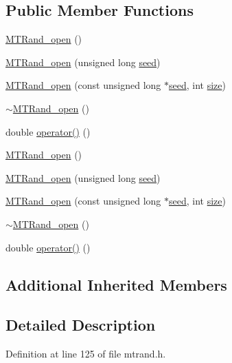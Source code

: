 \subsection*{Public Member Functions}
\begin{DoxyCompactItemize}
\item 
\hyperlink{a00019_a58140b54564be39382da163954177389}{M\+T\+Rand\+\_\+open} ()
\item 
\hyperlink{a00019_a1f55ebc1052f5343f8d6e08a752ef957}{M\+T\+Rand\+\_\+open} (unsigned long \hyperlink{a00018_a0c57076fe30358e0700a7ce1baa0ea27}{seed})
\item 
\hyperlink{a00019_a0216992f4dfa5acf22ee8c585eeac488}{M\+T\+Rand\+\_\+open} (const unsigned long $\ast$\hyperlink{a00018_a0c57076fe30358e0700a7ce1baa0ea27}{seed}, int \hyperlink{a00104_ae113ea7f9e515a12ac4b5595c6faf61e}{size})
\item 
\hyperlink{a00019_a4f4774b5d9b79972dedaec984b248581}{$\sim$\+M\+T\+Rand\+\_\+open} ()
\item 
double \hyperlink{a00019_ac408aa400ca59fc2afc888d88f98d807}{operator()} ()
\item 
\hyperlink{a00019_a58140b54564be39382da163954177389}{M\+T\+Rand\+\_\+open} ()
\item 
\hyperlink{a00019_a1f55ebc1052f5343f8d6e08a752ef957}{M\+T\+Rand\+\_\+open} (unsigned long \hyperlink{a00018_a0c57076fe30358e0700a7ce1baa0ea27}{seed})
\item 
\hyperlink{a00019_a0216992f4dfa5acf22ee8c585eeac488}{M\+T\+Rand\+\_\+open} (const unsigned long $\ast$\hyperlink{a00018_a0c57076fe30358e0700a7ce1baa0ea27}{seed}, int \hyperlink{a00104_ae113ea7f9e515a12ac4b5595c6faf61e}{size})
\item 
\hyperlink{a00019_a4f4774b5d9b79972dedaec984b248581}{$\sim$\+M\+T\+Rand\+\_\+open} ()
\item 
double \hyperlink{a00019_ac408aa400ca59fc2afc888d88f98d807}{operator()} ()
\end{DoxyCompactItemize}
\subsection*{Additional Inherited Members}


\subsection{Detailed Description}


Definition at line 125 of file mtrand.\+h.



